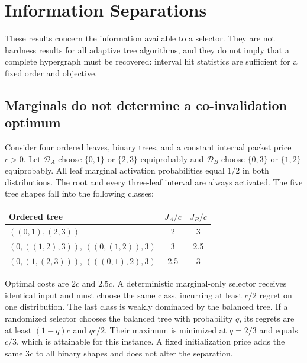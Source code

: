 \section{Information Separations}\label{app:sep}
These results concern the information available to a selector. They are not
hardness results for all adaptive tree algorithms, and they do not imply that a
complete hypergraph must be recovered: interval hit statistics are sufficient for
a fixed order and objective.

\subsection{Marginals do not determine a co-invalidation optimum}
Consider four ordered leaves, binary trees, and a constant internal packet price
$c>0$. Let $\mathcal D_A$ choose $\{0,1\}$ or $\{2,3\}$ equiprobably and
$\mathcal D_B$ choose $\{0,3\}$ or $\{1,2\}$ equiprobably. All leaf marginal
activation probabilities equal $1/2$ in both distributions. The root and every
three-leaf interval are always activated. The five tree shapes fall into the
following classes:
\begin{center}
\begin{tabular}{lc c}\toprule
Ordered tree & $J_A/c$ & $J_B/c$\\\midrule
$((0,1),(2,3))$ & 2 & 3\\
$(0,((1,2),3))$, $((0,(1,2)),3)$ & 3 & 2.5\\
$(0,(1,(2,3)))$, $(((0,1),2),3)$ & 2.5 & 3\\
\bottomrule\end{tabular}
\end{center}
Optimal costs are $2c$ and $2.5c$. A deterministic marginal-only selector receives
identical input and must choose the same class, incurring at least $c/2$ regret on
one distribution. The last class is weakly dominated by the balanced tree. If a
randomized selector chooses the balanced tree with probability $q$, its regrets
are at least $(1-q)c$ and $qc/2$. Their maximum is minimized at $q=2/3$ and equals
$c/3$, which is attainable for this instance. A fixed initialization price adds the
same $3c$ to all binary shapes and does not alter the separation.

